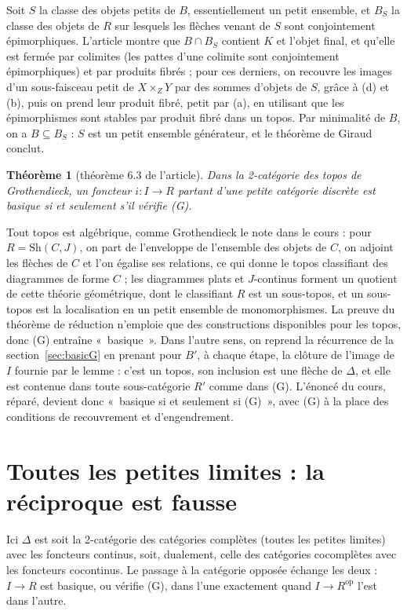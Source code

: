 \documentclass[11pt,a4paper]{amsart}
\theoremstyle{definition}
\theoremstyle{plain}
\newtheorem{theoreme}{Théorème}
\theoremstyle{remark}
\begin{document}
Soit $S$ la classe des objets petits de $B$, essentiellement un petit ensemble, et $B_S$ la classe des objets de $R$ sur lesquels les flèches venant de $S$ sont conjointement épimorphiques. L'article montre que $B\cap B_S$ contient $K$ et l'objet final, et qu'elle est fermée par colimites (les pattes d'une colimite sont conjointement épimorphiques) et par produits fibrés ; pour ces derniers, on recouvre les images d'un sous-faisceau petit de $X\times_ZY$ par des sommes d'objets de $S$, grâce à (d) et (b), puis on prend leur produit fibré, petit par (a), en utilisant que les épimorphismes sont stables par produit fibré dans un topos. Par minimalité de $B$, on a $B\subseteq B_S$ : $S$ est un petit ensemble générateur, et le théorème de Giraud conclut.

\begin{theoreme}[théorème 6.3 de l'article]
Dans la 2-catégorie des topos de Grothendieck, un foncteur $i\colon I\to R$ partant d'une petite catégorie discrète est basique si et seulement s'il vérifie (G).
\end{theoreme}

Tout topos est algébrique, comme Grothendieck le note dans le cours : pour $R=\mathrm{Sh}(C,J)$, on part de l'enveloppe de l'ensemble des objets de $C$, on adjoint les flèches de $C$ et l'on égalise ses relations, ce qui donne le topos classifiant des diagrammes de forme $C$ ; les diagrammes plats et $J$-continus forment un quotient de cette théorie géométrique, dont le classifiant $R$ est un sous-topos, et un sous-topos est la localisation en un petit ensemble de monomorphismes. La preuve du théorème de réduction n'emploie que des constructions disponibles pour les topos, donc (G) entraîne «~basique~». Dans l'autre sens, on reprend la récurrence de la section~\ref{sec:basicG} en prenant pour $B'$, à chaque étape, la clôture de l'image de $I$ fournie par le lemme : c'est un topos, son inclusion est une flèche de $\Delta$, et elle est contenue dans toute sous-catégorie $R'$ comme dans (G). L'énoncé du cours, réparé, devient donc «~basique si et seulement si (G)~», avec (G) à la place des conditions de recouvrement et d'engendrement.

\section{Toutes les petites limites : la réciproque est fausse}\label{sec:ens}

Ici $\Delta$ est soit la 2-catégorie des catégories complètes (toutes les petites limites) avec les foncteurs continus, soit, dualement, celle des catégories cocomplètes avec les foncteurs cocontinus. Le passage à la catégorie opposée échange les deux : $I\to R$ est basique, ou vérifie (G), dans l'une exactement quand $I\to R^{\mathrm{op}}$ l'est dans l'autre.
\end{document}
